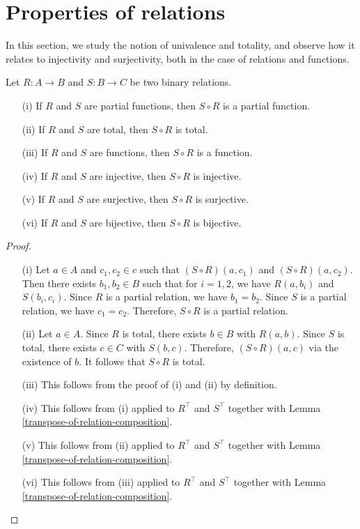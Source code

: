 
\section{Properties of relations}

In this section, we study the notion of univalence and totality, and observe how it relates to injectivity and surjectivity, both in the case of relations and functions.


\begin{proposition} \label{properties-of-relations-under-composition}
	Let $R : A \to B$ and $S : B \to C$ be two binary relations. 
	\begin{itemize}
		\item[(i)] If $R$ and $S$ are partial functions, then $S \circ R$ is a partial function.
		\item[(ii)] If $R$ and $S$ are total, then $S \circ R$ is total.
		\item[(iii)] If $R$ and $S$ are functions, then $S \circ R$ is a function.
		\item[(iv)] If $R$ and $S$ are injective, then $S \circ R$ is injective.
		\item[(v)] If $R$ and $S$ are surjective, then $S \circ R$ is surjective.
		\item[(vi)] If $R$ and $S$ are bijective, then $S \circ R$ is bijective.
	\end{itemize}
\end{proposition}

\begin{proof}
	\begin{itemize}
		\item[(i)] Let $a \in A$ and $c_1,c_2 \in c$ such that $(S \circ R)(a,c_1)$ and $(S \circ R)(a,c_2)$. Then there exists $b_1, b_2 \in B$ such that for $i=1,2$, we have $R(a,b_i)$ and $S(b_i, c_i)$. Since $R$ is a partial relation, we have $b_1 = b_2$. Since $S$ is a partial relation, we have $c_1 = c_2$. Therefore, $S \circ R$ is a partial relation.
		\\

		\item[(ii)] Let $a \in A$. Since $R$ is total, there exists $b \in B$ with $R(a,b)$. Since $S$ is total, there exists $c \in C$ with $S(b,c)$. Therefore, $(S \circ R)(a,c)$ via the existence of $b$. It follows that $S \circ R$ is total.

		\item[(iii)] This follows from the proof of (i) and (ii) by definition.

		\item[(iv)] This follows from (i) applied to $R^{\top}$ and $S^{\top}$ together with Lemma \autoref{transpose-of-relation-composition}.
		\item[(v)] This follows from (ii) applied to $R^{\top}$ and $S^{\top}$ together with Lemma \autoref{transpose-of-relation-composition}.
		\item[(vi)] This follows from (iii) applied to $R^{\top}$ and $S^{\top}$ together with Lemma \autoref{transpose-of-relation-composition}.
	\end{itemize}
\end{proof}

